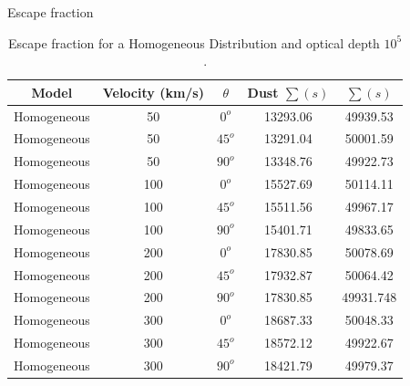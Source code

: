 \documentclass[usenatbib]{mn2e}
\begin{document}
Escape fraction\\

\begin{table}[H]
\begin{center}
\begin{tabular}{ccccc}\hline 
Model & Velocity (km/s) & $\theta$ & Dust $\sum (s)$& $\sum (s)$\\ \hline 
Homogeneous & 50 & $0^{o}$& 13293.06 &49939.53\\ 
Homogeneous & 50 & $45^{o}$& 13291.04 &50001.59\\ 
Homogeneous & 50 & $90^{o}$ & 13348.76 &49922.73\\ 
Homogeneous & 100 & $0^{o}$ & 15527.69 &50114.11\\ 
Homogeneous & 100 & $45^{o}$ & 15511.56 &49967.17\\ 
Homogeneous & 100 & $90^{o}$ & 15401.71 & 49833.65\\ 
Homogeneous & 200 & $0^{o}$  & 17830.85 & 50078.69\\ 
Homogeneous & 200 & $45^{o}$ & 17932.87 & 50064.42\\ 
Homogeneous & 200 & $90^{o}$ & 17830.85  & 49931.748\\ 
Homogeneous & 300 & $ 0^{o}$ & 18687.33 & 50048.33 \\ 
Homogeneous & 300 & $45^{o}$ & 18572.12& 49922.67\\ 
Homogeneous & 300 & $90^{o}$ & 18421.79 & 49979.37\\ \hline
\end{tabular}
\caption{Escape fraction for a Homogeneous Distribution and optical depth $10^{5}$.} 
\end{center}
\end{table}
\end{document}
